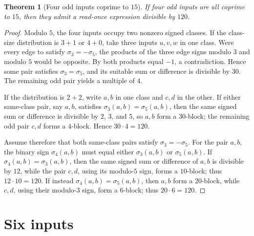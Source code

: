 \documentclass[11pt]{amsart}
\newtheorem{theorem}{Theorem}[section]
\theoremstyle{definition}
\theoremstyle{remark}
\begin{document}
\begin{theorem}[Four odd inputs coprime to $15$]\label{thm:4ocop120}
If four odd inputs are all coprime to $15$, then they admit a read-once
expression divisible by $120$.
\end{theorem}
\begin{proof}
Modulo $5$, the four inputs occupy two nonzero signed classes.  If the
class-size distribution is $3+1$ or $4+0$, take three inputs $u,v,w$ in one
class.  Were every edge to satisfy $\sigma_3=-\sigma_5$, the products of the
three edge signs modulo $3$ and modulo $5$ would be opposite.  By
 both products equal $-1$, a contradiction.  Hence some
pair satisfies $\sigma_3=\sigma_5$, and its suitable sum or difference is
divisible by $30$.  The remaining odd pair yields a multiple of $4$.

If the distribution is $2+2$, write $a,b$ in one class and $c,d$ in the
other.  If either same-class pair, say $a,b$, satisfies
$\sigma_3(a,b)=\sigma_5(a,b)$, then the same signed sum or difference is
divisible by $2$, $3$, and $5$, so $a,b$ form a $30$-block; the remaining
odd pair $c,d$ forms a $4$-block.  Hence $30\cdot4=120$.

Assume therefore that both same-class pairs satisfy
$\sigma_3=-\sigma_5$.  For the pair $a,b$, the binary sign
$\sigma_4(a,b)$ must equal either $\sigma_3(a,b)$ or
$\sigma_5(a,b)$.  If $\sigma_4(a,b)=\sigma_3(a,b)$, then the same signed
sum or difference of $a,b$ is divisible by $12$, while the pair $c,d$, using
its modulo-$5$ sign, forms a $10$-block; thus $12\cdot10=120$.  If instead
$\sigma_4(a,b)=\sigma_5(a,b)$, then $a,b$ form a $20$-block, while $c,d$,
using their modulo-$3$ sign, form a $6$-block; thus $20\cdot6=120$.
\end{proof}

\section{Six inputs}
\end{document}

